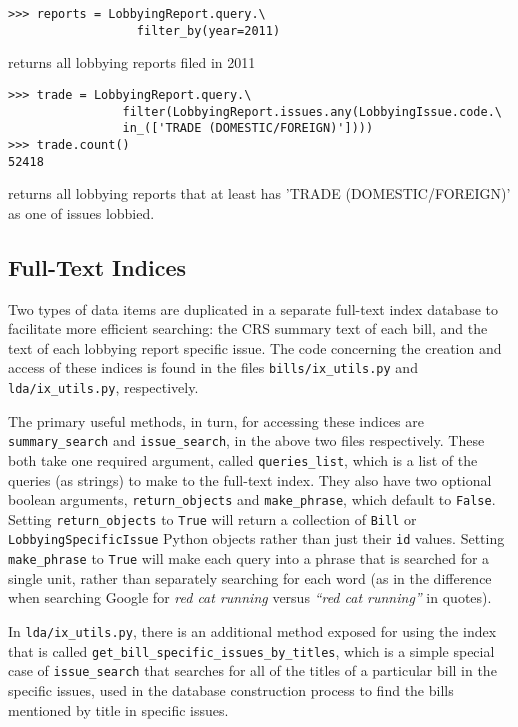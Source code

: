 \documentclass[11pt,letterpaper]{article}
\theoremstyle{plain}
\begin{document}
\bigskip

\begin{verbatim}
>>> reports = LobbyingReport.query.\
                  filter_by(year=2011)
\end{verbatim}
returns all lobbying reports filed in 2011

\bigskip
{}
\begin{verbatim}
>>> trade = LobbyingReport.query.\
                filter(LobbyingReport.issues.any(LobbyingIssue.code.\
                in_(['TRADE (DOMESTIC/FOREIGN)'])))
>>> trade.count()
52418
\end{verbatim}
returns all lobbying reports that at least has 'TRADE
(DOMESTIC/FOREIGN)' as one of issues lobbied.

\subsection{Full-Text Indices}

Two types of data items are duplicated in a separate full-text index
database to facilitate more efficient searching: the CRS summary text
of each bill, and the text of each lobbying report specific issue.
The code concerning the creation and access of these indices is found
in the files \texttt{bills/ix\_utils.py} and
\texttt{lda/ix\_utils.py}, respectively.

The primary useful methods, in turn, for accessing these indices are
\texttt{summary\_search} and \texttt{issue\_search}, in the above two
files respectively.  These both take one required argument, called
\texttt{queries\_list}, which is a list of the queries (as strings) to
make to the full-text index.  They also have two optional boolean
arguments, \texttt{return\_objects} and \texttt{make\_phrase}, which
default to \texttt{False}.  Setting \texttt{return\_objects} to
\texttt{True} will return a collection of \texttt{Bill} or
\texttt{LobbyingSpecificIssue} Python objects rather than just their
\texttt{id} values.  Setting \texttt{make\_phrase} to \texttt{True}
will make each query into a phrase that is searched for a single unit,
rather than separately searching for each word (as in the difference
when searching Google for \emph{red cat running} versus \emph{``red
  cat running''} in quotes).

In \texttt{lda/ix\_utils.py}, there is an additional method exposed for using the index that is called \texttt{get\_bill\_specific\_issues\_by\_titles}, which is a simple special case of \texttt{issue\_search} that searches for all of the titles of a particular bill in the specific issues, used in the database construction process to find the bills mentioned by title in specific issues.
\end{document}
